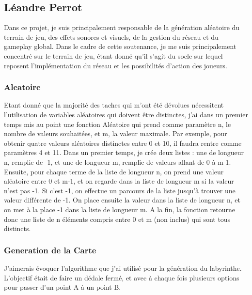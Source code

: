 \documentclass{article}
\begin{document}
\newpage
\subsection{Léandre Perrot}
Dans ce projet, je suis principalement responsable de la génération aléatoire du terrain de jeu, des effets sonores et visuels, de la gestion du réseau et du gameplay global. Dans le cadre de cette soutenance, je me suis principalement concentré sur le terrain de jeu, étant donné qu'il s'agit du socle sur lequel reposent l'implémentation du réseau et les possibilités d'action des joueurs.

\subsubsection{Aleatoire}
Etant donné que la majorité des taches qui m'ont été dévolues nécessitent l'utilisation de variables aléatoires qui doivent être distinctes, j'ai dans un premier temps mis au point une fonction Aléatoire qui prend comme paramètre n, le nombre de valeurs souhaitées, et m, la valeur maximale. Par exemple, pour obtenir quatre valeurs aléatoires distinctes entre 0 et 10, il faudra rentre comme paramètres 4 et 11. Dans un premier temps, je crée deux listes : une de longueur n, remplie de -1, et une de longueur m, remplie de valeurs allant de 0 à m-1. Ensuite, pour chaque terme de la liste de longueur n, on prend une valeur aléatoire entre 0 et m-1, et on regarde dans la liste de longueur m si la valeur n'est pas -1. Si c'est -1, on effectue un parcours de la liste jusqu'à trouver une valeur différente de -1. On place ensuite la valeur dans la liste de longueur n, et on met à la place -1 dans la liste de longueur m. A la fin, la fonction retourne donc une liste de n éléments compris entre 0 et m (non inclus) qui sont tous distincts.

\subsubsection{Generation de la Carte}
J'aimerais évoquer l'algorithme que j'ai utilisé pour la génération du labyrinthe. L'objectif était de faire un dédale fermé, et avec à chaque fois plusieurs options pour passer d'un point A à un point B.
\end{document}
